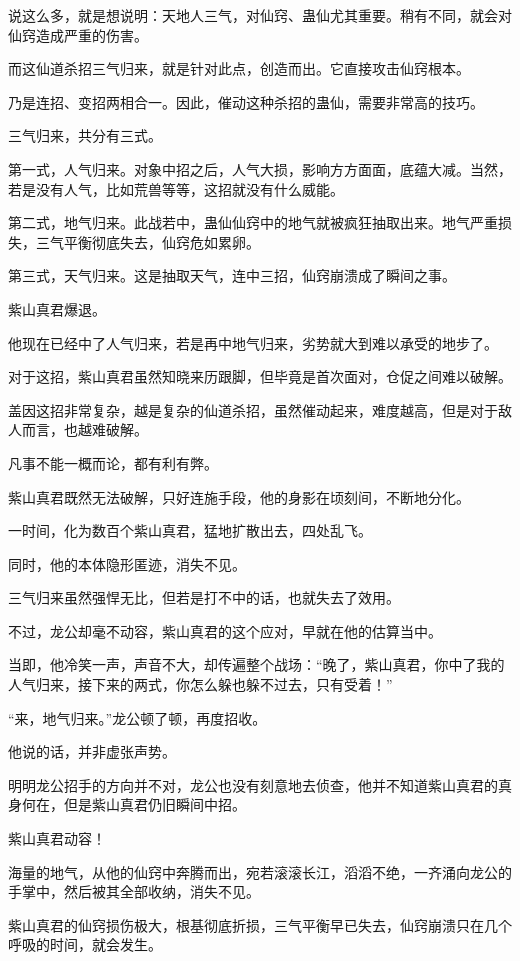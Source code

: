 \begin{this_body}
说这么多，就是想说明：天地人三气，对仙窍、蛊仙尤其重要。稍有不同，就会对仙窍造成严重的伤害。

而这仙道杀招三气归来，就是针对此点，创造而出。它直接攻击仙窍根本。

乃是连招、变招两相合一。因此，催动这种杀招的蛊仙，需要非常高的技巧。

三气归来，共分有三式。

第一式，人气归来。对象中招之后，人气大损，影响方方面面，底蕴大减。当然，若是没有人气，比如荒兽等等，这招就没有什么威能。

第二式，地气归来。此战若中，蛊仙仙窍中的地气就被疯狂抽取出来。地气严重损失，三气平衡彻底失去，仙窍危如累卵。

第三式，天气归来。这是抽取天气，连中三招，仙窍崩溃成了瞬间之事。

紫山真君爆退。

他现在已经中了人气归来，若是再中地气归来，劣势就大到难以承受的地步了。

对于这招，紫山真君虽然知晓来历跟脚，但毕竟是首次面对，仓促之间难以破解。

盖因这招非常复杂，越是复杂的仙道杀招，虽然催动起来，难度越高，但是对于敌人而言，也越难破解。

凡事不能一概而论，都有利有弊。

紫山真君既然无法破解，只好连施手段，他的身影在顷刻间，不断地分化。

一时间，化为数百个紫山真君，猛地扩散出去，四处乱飞。

同时，他的本体隐形匿迹，消失不见。

三气归来虽然强悍无比，但若是打不中的话，也就失去了效用。

不过，龙公却毫不动容，紫山真君的这个应对，早就在他的估算当中。

当即，他冷笑一声，声音不大，却传遍整个战场：“晚了，紫山真君，你中了我的人气归来，接下来的两式，你怎么躲也躲不过去，只有受着！”

“来，地气归来。”龙公顿了顿，再度招收。

他说的话，并非虚张声势。

明明龙公招手的方向并不对，龙公也没有刻意地去侦查，他并不知道紫山真君的真身何在，但是紫山真君仍旧瞬间中招。

紫山真君动容！

海量的地气，从他的仙窍中奔腾而出，宛若滚滚长江，滔滔不绝，一齐涌向龙公的手掌中，然后被其全部收纳，消失不见。

紫山真君的仙窍损伤极大，根基彻底折损，三气平衡早已失去，仙窍崩溃只在几个呼吸的时间，就会发生。


\end{this_body}
